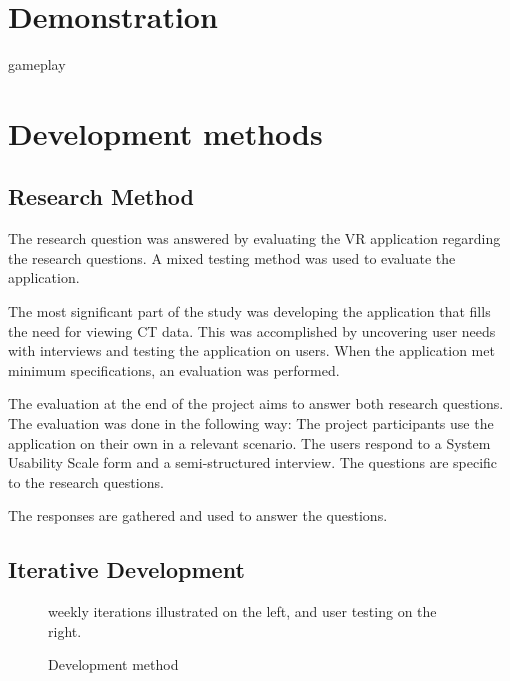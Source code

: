 \documentclass[a4paper]{report}
\begin{document}
\section{Demonstration}\label{demonstration}
gameplay

\section{Development methods}

\subsection{Research Method}
The research question was answered by evaluating the VR application regarding the research questions. A mixed testing method was used to evaluate the application.

The most significant part of the study was developing the application that fills the need for viewing CT data. This was accomplished by uncovering user needs with interviews and testing the application on users. When the application met minimum specifications, an evaluation was performed.

The evaluation at the end of the project aims to answer both research questions. The evaluation was done in the following way:
The project participants use the application on their own in a relevant scenario.
The users respond to a System Usability Scale form and a semi-structured interview. The questions are specific to the research questions.

The responses are gathered and used to answer the questions.

\subsection{Iterative Development}

\begin{figure}[h!]
    \centering
	\hfill
  \caption{Development method}
  \label{agile}
  \small
  weekly iterations illustrated on the left, and user testing on the right.
\end{figure}
\end{document}
